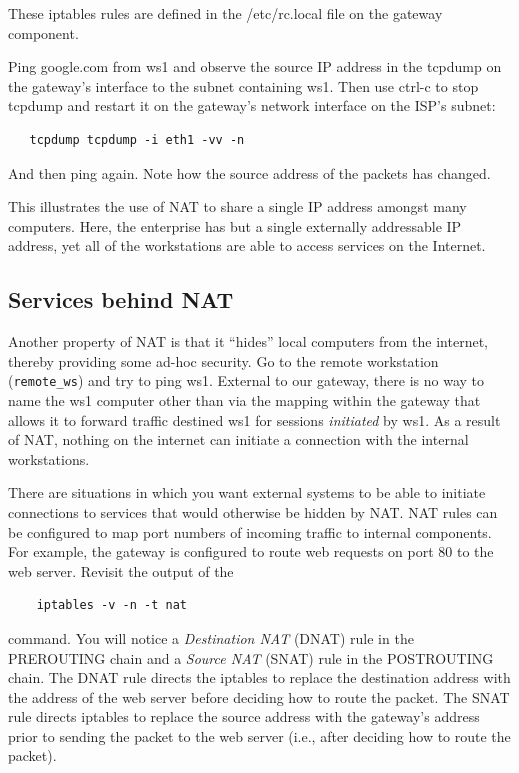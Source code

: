 These iptables rules are defined in the /etc/rc.local file on the gateway component.  

Ping google.com from ws1 and observe the source IP address in the tcpdump on the gateway's interface
to the subnet containing ws1.  Then use ctrl-c to stop tcpdump and restart it on the gateway's
network interface on the ISP's subnet:
\begin{verbatim}
   tcpdump tcpdump -i eth1 -vv -n
\end{verbatim}
\noindent And then ping again.  Note how the source address of the packets has changed.

This illustrates the use of NAT to share a single IP address amongst many computers.  Here,
the enterprise has but a single externally addressable IP address, yet all of the workstations are able to 
access services on the Internet.

\subsection{Services behind NAT}
Another property of NAT is that it ``hides'' local computers from the internet, thereby providing some
ad-hoc security.  Go to the remote workstation
({\tt remote\_ws}) and try to ping ws1.  External to our gateway, there is no way to name the ws1 computer other than
via the mapping within the gateway that allows it to forward traffic destined ws1 for sessions \textit{initiated} by ws1.
As a result of NAT, nothing on the internet can initiate a connection with the internal workstations.  

There are situations in which you want external systems to be able to initiate connections to services that would
otherwise be hidden by NAT.
NAT rules can be configured to map port numbers of incoming traffic to internal components.  For example, the gateway
is configured to route web requests on port 80 to the web server.  Revisit the output of the
\begin{verbatim}
    iptables -v -n -t nat
\end{verbatim}
command. You will notice a \textit{Destination NAT} (DNAT) rule in the PREROUTING chain and 
a \textit{Source NAT} (SNAT) rule in the POSTROUTING chain. 
The DNAT rule directs the iptables to replace the destination address with the address of the web server before
deciding how to route the packet.
The SNAT rule directs iptables to replace the source address with the gateway's address prior to sending
the packet to the web server (i.e., after deciding how to route the packet).

